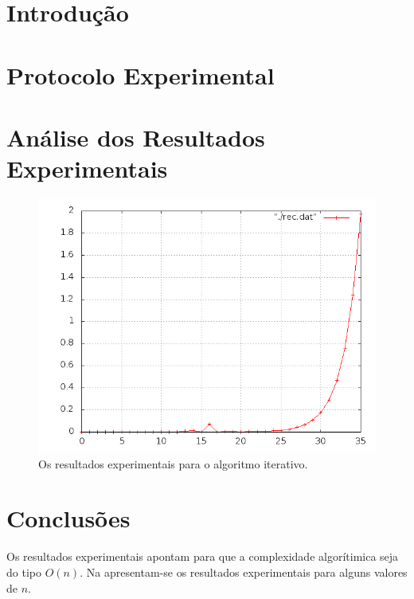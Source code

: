 \documentclass[12pt,a4paper,headsepline,bibtotoc,twoside]{scrbook}
\begin{document}
\section{Introdução}
\section{Protocolo Experimental}

\section{Análise dos Resultados Experimentais}

\begin{figure}
  \centering
  \includegraphics[width=14cm]{teste.png}
  \caption{Os resultados experimentais para o algoritmo iterativo.}
  \label{fig:rec}
\end{figure}
\section{Conclusões}
Os resultados experimentais apontam para que a complexidade algorítimica seja do tipo $O(n)$. Na  apresentam-se os resultados experimentais para alguns valores de $n$. 
\end{document}
